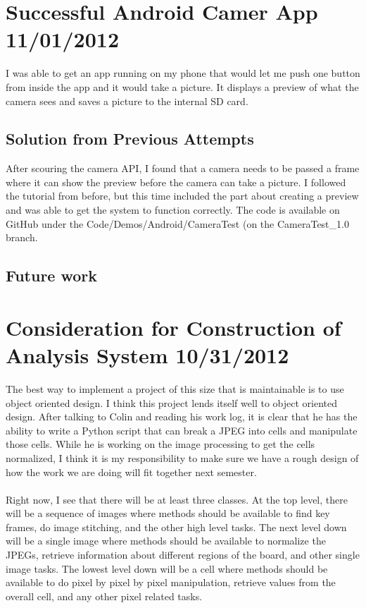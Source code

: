 \documentclass[]{article}
\begin{document}
	\tableofcontents
	\newpage
	\setcounter{page}{1}
	\thispagestyle{empty}
	
	
	\setlength{\parindent}{0pt}
	\setlength{\parskip}{6pt}
	
	\section{Successful Android Camer App 11/01/2012}
		I was able to get an app running on my phone that would let me push one button from inside the app and it would take a picture. It displays a preview of what the camera sees and saves a picture to the internal SD card. 
		
		\subsection{Solution from Previous Attempts}
			After scouring the camera API, I found that a camera needs to be passed a frame where it can show the preview before the camera can take a picture. I followed the tutorial from before, but this time included the part about creating a preview and was able to get the system to function correctly. The code is available on  GitHub under the Code/Demos/Android/CameraTest (on the CameraTest_1.0 branch. 
			
		\subsection{Future work}
	
	
	\section{Consideration for Construction of Analysis System 10/31/2012}
		The best way to implement a project of this size that is maintainable is to use object oriented design. I think this project lends itself well to object oriented design. After talking to Colin and reading his work log, it is clear that he has the ability to write a Python script that can break a JPEG into cells and manipulate those cells. While he is working on the image processing to get the cells normalized, I think it is my responsibility to make sure we have a rough design of how the work we are doing will fit together next semester. \\
		\\
		Right now, I see that there will be at least three classes. At the top level, there will be a sequence of images where methods should be available to find key frames, do image stitching, and the other high level tasks. The next level down will be a single image where methods should be available to normalize the JPEGs, retrieve information about different regions of the board, and other single image tasks. The lowest level down will be a cell where methods should be available to do pixel by pixel by pixel manipulation, retrieve values from the overall cell, and any other pixel related tasks. 
		
\end{document}
